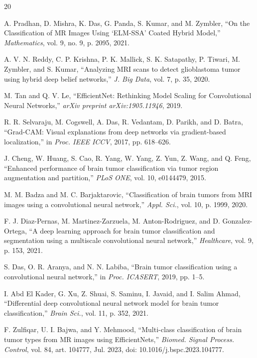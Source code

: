 \documentclass[journal]{IEEEtran}
\begin{document}
\begin{thebibliography}{20}

 A. Pradhan, D. Mishra, K. Das, G. Panda, S. Kumar, and M. Zymbler, ``On the Classification of MR Images Using `ELM-SSA' Coated Hybrid Model,'' \emph{Mathematics}, vol. 9, no. 9, p. 2095, 2021.

 A. V. N. Reddy, C. P. Krishna, P. K. Mallick, S. K. Satapathy, P. Tiwari, M. Zymbler, and S. Kumar, ``Analyzing MRI scans to detect glioblastoma tumor using hybrid deep belief networks,'' \emph{J. Big Data}, vol. 7, p. 35, 2020.

 M. Tan and Q. V. Le, ``EfficientNet: Rethinking Model Scaling for Convolutional Neural Networks,'' \emph{arXiv preprint arXiv:1905.11946}, 2019.

 R. R. Selvaraju, M. Cogswell, A. Das, R. Vedantam, D. Parikh, and D. Batra, ``Grad-CAM: Visual explanations from deep networks via gradient-based localization,'' in \emph{Proc. IEEE ICCV}, 2017, pp. 618--626.

 J. Cheng, W. Huang, S. Cao, R. Yang, W. Yang, Z. Yun, Z. Wang, and Q. Feng, ``Enhanced performance of brain tumor classification via tumor region augmentation and partition,'' \emph{PLoS ONE}, vol. 10, e0144479, 2015.

 M. M. Badza and M. C. Barjaktarovic, ``Classification of brain tumors from MRI images using a convolutional neural network,'' \emph{Appl. Sci.}, vol. 10, p. 1999, 2020.

 F. J. Diaz-Pernas, M. Martinez-Zarzuela, M. Anton-Rodriguez, and D. Gonzalez-Ortega, ``A deep learning approach for brain tumor classification and segmentation using a multiscale convolutional neural network,'' \emph{Healthcare}, vol. 9, p. 153, 2021.

 S. Das, O. R. Aranya, and N. N. Labiba, ``Brain tumor classification using a convolutional neural network,'' in \emph{Proc. ICASERT}, 2019, pp. 1--5.

 I. Abd El Kader, G. Xu, Z. Shuai, S. Saminu, I. Javaid, and I. Salim Ahmad, ``Differential deep convolutional neural network model for brain tumor classification,'' \emph{Brain Sci.}, vol. 11, p. 352, 2021.

 F. Zulfiqar, U. I. Bajwa, and Y. Mehmood, ``Multi-class classification of brain tumor types from MR images using EfficientNets,'' \emph{Biomed. Signal Process. Control}, vol. 84, art. 104777, Jul. 2023, doi: 10.1016/j.bspc.2023.104777.


\end{thebibliography}
\end{document}
